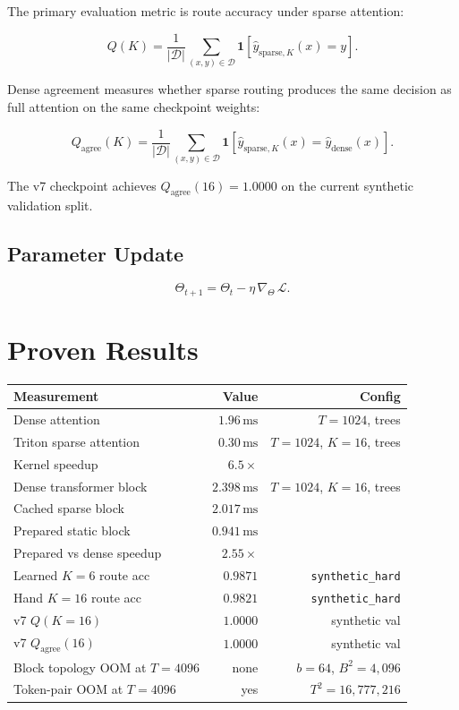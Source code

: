 \documentclass[11pt]{article}
\begin{document}
The primary evaluation metric is route accuracy under sparse attention:

\[
Q(K)
= \frac{1}{|\mathcal{D}|}
  \sum_{(x,y)\in\mathcal{D}}
  \mathbf{1}\!\left[\hat{y}_{\text{sparse},K}(x) = y\right].
\]

Dense agreement measures whether sparse routing produces the same
decision as full attention on the same checkpoint weights:

\[
Q_{\text{agree}}(K)
= \frac{1}{|\mathcal{D}|}
  \sum_{(x,y)\in\mathcal{D}}
  \mathbf{1}\!\left[\hat{y}_{\text{sparse},K}(x) = \hat{y}_{\text{dense}}(x)\right].
\]

The v7 checkpoint achieves $Q_{\text{agree}}(16) = 1.0000$ on the
current synthetic validation split.

\subsection*{Parameter Update}

\[
\Theta_{t+1} = \Theta_t - \eta\,\nabla_\Theta\,\mathcal{L}.
\]

\section*{Proven Results}

\begin{center}
\begin{tabular}{lrr}
\toprule
Measurement & Value & Config \\
\midrule
Dense attention          & $1.96\,\text{ms}$  & $T=1024$, trees \\
Triton sparse attention  & $0.30\,\text{ms}$  & $T=1024$, $K=16$, trees \\
Kernel speedup           & $6.5\times$        & \\
\midrule
Dense transformer block  & $2.398\,\text{ms}$ & $T=1024$, $K=16$, trees \\
Cached sparse block      & $2.017\,\text{ms}$ & \\
Prepared static block    & $0.941\,\text{ms}$ & \\
Prepared vs dense speedup & $2.55\times$      & \\
\midrule
Learned $K=6$ route acc  & $0.9871$           & \texttt{synthetic\_hard} \\
Hand $K=16$ route acc    & $0.9821$           & \texttt{synthetic\_hard} \\
\midrule
v7 $Q(K{=}16)$           & $1.0000$           & synthetic val \\
v7 $Q_{\text{agree}}(16)$& $1.0000$           & synthetic val \\
\midrule
Block topology OOM at $T=4096$ & none & $b=64$, $B^2=4{,}096$ \\
Token-pair OOM at $T=4096$     & yes  & $T^2=16{,}777{,}216$ \\
\bottomrule
\end{tabular}
\end{center}
\end{document}
